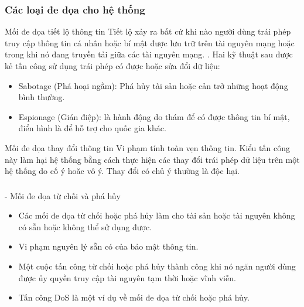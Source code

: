 \documentclass{beamer}
\begin{document}
\begin{frame}
\frametitle{Các loại đe dọa cho hệ thống}
\begin{block}{ Mối đe dọa tiết lộ thông tin}
 Tiết lộ xảy ra bất cứ khi nào người dùng trái phép truy cập thông tin cá nhân hoặc bí mật được lưu trữ trên tài nguyên mạng hoặc trong khi nó đang truyền tải giữa các tài nguyên mạng. . Hai kỹ thuật sau được kẻ tấn công sử dụng trái phép có được hoặc sửa đổi dữ liệu:
 \begin{itemize}
\item Sabotage (Phá hoại ngầm): Phá hủy tài sản hoặc cản trở  những hoạt động bình thường.
\item Espionage (Gián điệp): là hành động do thám để có được thông tin bí mật, điển hình là để hỗ trợ cho quốc gia khác.
\end{itemize}
\end{block}

\begin{block}{Mối đe dọa thay đổi thông tin}
Vi phạm tính toàn vẹn thông tin. Kiểu tấn công này làm hại hệ thống bằng cách thực hiện các thay đổi trái phép dữ liệu trên một hệ thống do cố ý hoăc vô ý. Thay đổi có chủ ý thường là độc hại. 
\end{block}

\end{frame}

\begin{frame}
\frametitle{}
\begin{block}{ - Mối đe dọa từ chối và phá hủy}
 
 \begin{itemize}
\item Các mối đe dọa từ chối hoặc phá hủy làm cho tài sản hoặc tài nguyên không có sẵn hoặc không thể sử dụng được.
\item Vi phạm nguyên lý sẵn có của bảo mật thông tin.
\item Một cuộc tấn công từ chối hoặc phá hủy thành công khi nó ngăn người dùng được ủy quyền truy cập tài nguyên tạm thời hoặc vĩnh viễn.
\item Tấn công DoS là một ví dụ về mối đe dọa từ chối hoặc phá hủy.
\end{itemize}
\end{block}
\end{frame}

\end{document}
